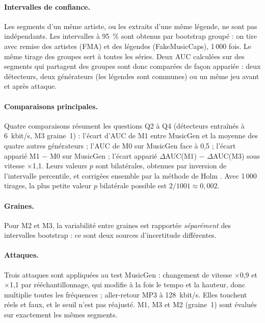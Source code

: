 \documentclass[a4paper, 11pt]{article}
\newcommand{\dAUC}{$\Delta$AUC}
\begin{document}
\paragraph{Intervalles de confiance.} Les segments d'un même artiste, ou les extraits d'une même légende, ne
sont pas indépendants. Les intervalles à 95~\% sont obtenus par bootstrap groupé
\cite{efron1993bootstrap} : on tire avec remise des artistes (FMA) et des légendes (FakeMusicCaps), 1\,000 fois.
Le même tirage des groupes sert à toutes les séries. Deux AUC calculées sur des segments qui partagent
des groupes sont donc comparées de façon appariée : deux détecteurs, deux générateurs (les légendes sont
communes) ou un même jeu avant et après attaque.

\paragraph{Comparaisons principales.} Quatre comparaisons résument les questions Q2 à Q4 (détecteurs entraînés
à 6~kbit/s, M3 graine~1) : l'écart d'AUC de M1 entre MusicGen et la moyenne des quatre autres générateurs ;
l'AUC de M0 sur MusicGen face à 0,5 ; l'écart apparié M1 $-$ M0 sur MusicGen ; l'écart apparié
\dAUC(M1) $-$ \dAUC(M3) sous vitesse $\times$1,1. Leurs valeurs $p$ sont bilatérales, obtenues par inversion de
l'intervalle percentile, et corrigées ensemble par la méthode de Holm \cite{holm1979}. Avec 1\,000 tirages, la
plus petite valeur $p$ bilatérale possible est $2/1001 \approx 0{,}002$.

\paragraph{Graines.} Pour M2 et M3, la variabilité entre graines est rapportée \emph{séparément} des
intervalles bootstrap : ce sont deux sources d'incertitude différentes.

\paragraph{Attaques.} Trois attaques sont appliquées au test MusicGen : changement de vitesse $\times$0,9 et
$\times$1,1 par rééchantillonnage, qui modifie à la fois le tempo et la hauteur, donc multiplie toutes les
fréquences ; aller-retour MP3 à 128~kbit/s. Elles touchent réels et faux, et le seuil n'est pas réajusté. M1,
M3 et M2 (graine~1) sont évalués sur exactement les mêmes segments.

\end{document}
